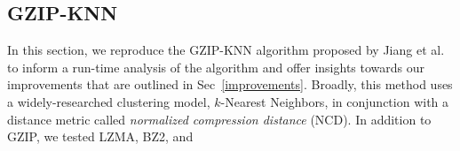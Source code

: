 \documentclass{article}
\begin{document}
\subsection{GZIP-KNN}
In this section, we reproduce the GZIP-KNN algorithm proposed by Jiang et al. to inform a run-time analysis of the algorithm and offer insights towards our  improvements that are outlined in Sec~\ref{improvements}. Broadly, this method uses a widely-researched clustering model, $k$-Nearest Neighbors, in conjunction with a  distance metric called \textit{normalized compression distance} (NCD). In addition to GZIP, we tested LZMA, BZ2, and 


\end{document}
